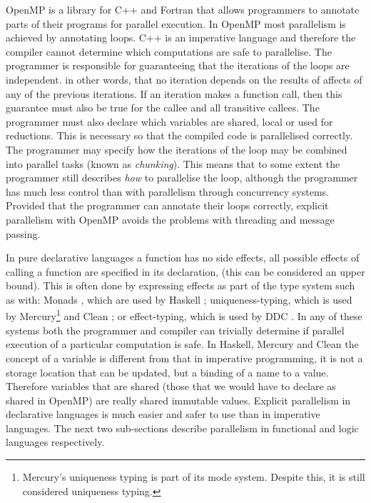 OpenMP \citep{openmp} is a library for C++ \citep{cplusplus} and Fortran
that allows programmers to annotate parts of their programs for parallel
execution.
In OpenMP most parallelism is achieved by annotating loops.
C++ is an imperative language and therefore the compiler cannot determine
which computations are safe to parallelise.
The programmer is responsible for guaranteeing that the iterations
of the loops are independent.
in other words, that no iteration depends on the results of affects of any of
the previous iterations.
If an iteration makes a function call, then this guarantee must also be true for
the callee and all transitive callees.
The programmer must also declare which variables are shared, local or used
for reductions.
This is necessary so that the compiled code is parallelised correctly.
The programmer may specify how the iterations of the loop may be
combined into parallel tasks (known as \emph{chunking}).
This means that to some extent the programmer still describes \emph{how} to
parallelise the loop,
although the programmer has much less control than with parallelism through
concurrency systems.
Provided that the programmer can annotate their loops correctly,
explicit parallelism with OpenMP avoids the problems
with threading and message passing.

In pure declarative languages
a function has no side effects,
all possible effects of calling a function are specified in its 
declaration, (this can be considered an upper bound).
This is often done by expressing effects as part of the type system such as
with:
Monads \citep{haskell-monads}, which are used by Haskell \citep{haskell98};
uniqueness-typing, which is used by
Mercury\footnote{
    Mercury's uniqueness typing is part of its mode system.
    Despite this, it is still considered uniqueness typing.}
\citep{mercury_jlp}
and Clean \citep{brus:1987:clean};
or effect-typing, which is used by DDC \citep{ddc}.
In any of these systems both the programmer and compiler can trivially
determine if parallel execution of a particular computation is safe.
In Haskell, Mercury and Clean
the concept of a variable is different from that in imperative programming,
it is not a storage location that can be updated,
but a binding of a name to a value.
Therefore variables that are shared
(those that we would have to declare as shared in OpenMP)
are really shared immutable values.
Explicit parallelism in declarative languages is much easier and safer to use
than in imperative languages.
The next two sub-sections describe parallelism in functional and logic
languages respectively.

